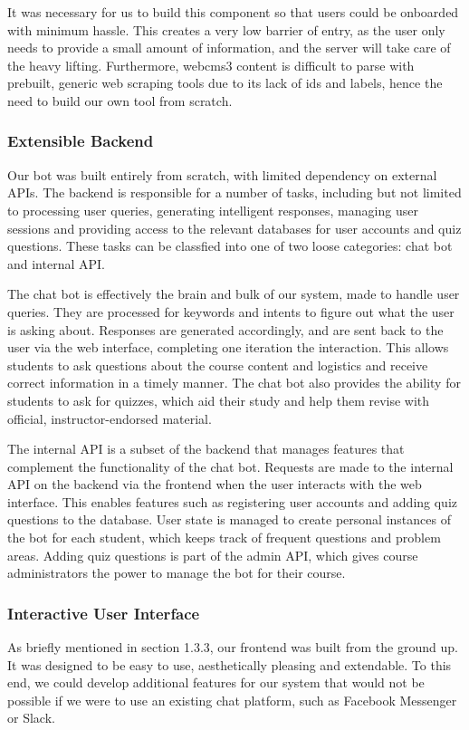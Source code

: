It was necessary for us to build this component so that users could be onboarded with minimum hassle. This creates a very low barrier of entry, as the user only needs to provide a small amount of information, and the server will take care of the heavy lifting. Furthermore, webcms3 content is difficult to parse with prebuilt, generic web scraping tools due to its lack of ids and labels, hence the need to build our own tool from scratch.

\subsubsection{Extensible Backend}
Our bot was built entirely from scratch, with limited dependency on external APIs. The backend is responsible for a number of tasks, including but not limited to processing user queries, generating intelligent responses, managing user sessions and providing access to the relevant databases for user accounts and quiz questions. These tasks can be classfied into one of two loose categories: chat bot and internal API.

The chat bot is effectively the brain and bulk of our system, made to handle user queries. They are processed for keywords and intents to figure out what the user is asking about. Responses are generated accordingly, and are sent back to the user via the web interface, completing one iteration the interaction. This allows students to ask questions about the course content and logistics and receive correct information in a timely manner. The chat bot also provides the ability for students to ask for quizzes, which aid their study and help them revise with official, instructor-endorsed material.

The internal API is a subset of the backend that manages features that complement the functionality of the chat bot. Requests are made to the internal API on the backend via the frontend when the user interacts with the web interface. This enables features such as registering user accounts and adding quiz questions to the database. User state is managed to create personal instances of the bot for each student, which keeps track of frequent questions and problem areas. Adding quiz questions is part of the admin API, which gives course administrators the power to manage the bot for their course.

\subsubsection{Interactive User Interface}
As briefly mentioned in section 1.3.3, our frontend was built from the ground up. It was designed to be easy to use, aesthetically pleasing and extendable. To this end, we could develop additional features for our system that would not be possible if we were to use an existing chat platform, such as Facebook Messenger or Slack.

